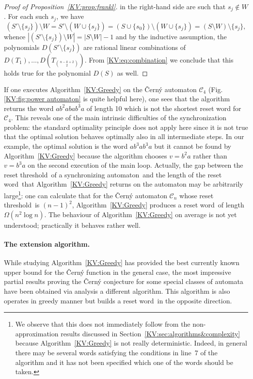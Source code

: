 \documentclass{irmaart}
\newcommand{\san}{synchronizing au\-tom\-a\-ton}
\newcommand{\sw}{reset word}
\newcommand{\rt}{reset threshold}
\theoremstyle{plain}
\begin{document}
\begin{proof}[Proof of Proposition~\ref{KV:prop:frankl}]
in the right-hand side are such that $s_j\notin W$. For each such $s_j$, we
have
\begin{displaymath}
(S'\setminus\{s_j\})\setminus
W=S'\setminus(W\cup\{s_j\})=(S\cup\{s_0\})\setminus(W\cup\{s_j\})=(S\setminus
W)\setminus\{s_j\},
\end{displaymath}
whence $|(S'\setminus\{s_j\})\setminus W|=|S\setminus W|-1$ and by the
inductive assumption, the polynomials $D(S'\setminus\{s_j\})$ are rational
linear combinations of $D(T_1),\dots,D(T_{\binom{n-k+2}2})$. From
\eqref{KV:eq:combination} we conclude that this holds true for the polynomial
$D(S)$ as well.
\end{proof}

If one executes Algorithm~\ref{KV:Greedy} on the \v{C}ern\'{y} automaton
$\mathcal{C}_{4}$ (Fig.\,\ref{KV:fig:power automaton} is quite helpful here),
one sees that the algorithm returns the word $ab^2abab^3a$ of length 10 which
is not the shortest reset word for $\mathcal{C}_{4}$. This reveals one of the
main intrinsic difficulties of the synchronization problem: the standard
optimality principle does not apply here since it is not true that the optimal
solution behaves optimally also in all intermediate steps. In our example, the
optimal solution is the word $ab^3ab^3a$ but it cannot be found by
Algorithm~\ref{KV:Greedy} because the algorithm chooses $v=b^2a$ rather than
$v=b^3a$ on the second execution of the main loop. Actually, the gap between
the \rt\ of a \san\ and the length of the \sw\ that Algorithm~\ref{KV:Greedy}
returns on the automaton may be arbitrarily large\footnote{We observe that this
does not immediately follow from the non-approximation results discussed in
Section~\ref{KV:sec:algorithms&complexity} because Algorithm~\ref{KV:Greedy} is
not really deterministic. Indeed, in general there may be several words
satisfying the conditions in line~7 of the algorithm and it has not been
specified which one of the words should be taken.}: one can calculate that for
the \v{C}ern\'{y} automaton $\mathcal{C}_{n}$ whose \rt\ is $(n-1)^2$,
Algorithm~\ref{KV:Greedy} produces a \sw\ of length $\Omega(n^2\log n)$. The
behaviour of Algorithm~\ref{KV:Greedy} on average is not yet understood;
practically it behaves rather well.

\paragraph*{The extension algorithm.} While studying Algorithm~\ref{KV:Greedy}
has provided the best currently known upper bound for the \v{C}ern\'{y}
function in the general case, the most impressive partial results proving the
\v{C}ern\'{y} conjecture for some special classes of automata have been
obtained via analysis a different algorithm. This algorithm is also operates in
greedy manner but builds a \sw\ in the opposite direction.
\end{document}
